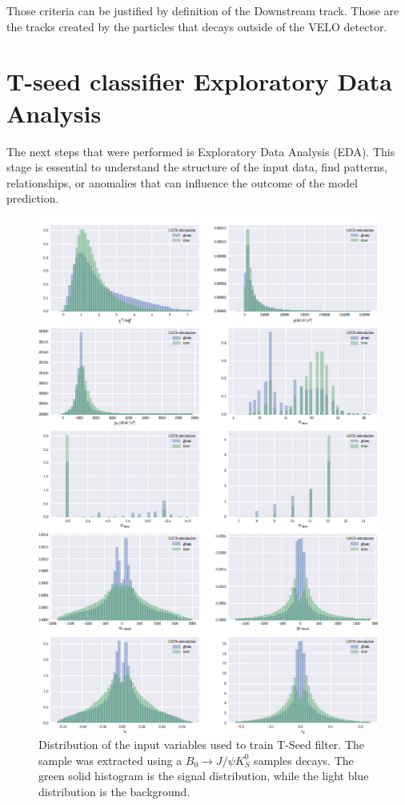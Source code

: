 Those criteria can be justified by definition of the Downstream track. Those are the tracks created by the particles that decays outside of the VELO detector. 

\section{T-seed classifier Exploratory Data Analysis}

The next steps that were performed is Exploratory Data Analysis (EDA). This stage is essential to understand the structure of the input data, find patterns, relationships, or anomalies that can influence the outcome of the model prediction.   

\begin{figure}
\centering
\includegraphics[scale=0.9]{figures/features_2.png}
\caption{Distribution of the input variables used to train T-Seed filter. The sample was extracted using a $B_0\rightarrow J/\psi K_S^0 $ samples decays. The green solid histogram is the signal distribution, while the light blue
distribution is the background.
\label{fig:input features}}
\end{figure}

